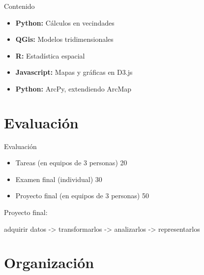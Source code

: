 \documentclass[10pt]{beamer}
\begin{document}
\begin{frame}{Contenido}

  \begin{itemize}
  \item \textbf{Python:} Cálculos en vecindades 
  \item \textbf{QGis:} Modelos tridimensionales
  \item \textbf{R:} Estadística espacial
  \item \textbf{Javascript:} Mapas y gráficas en D3.js
  \item \textbf{Python:} ArcPy, extendiendo ArcMap
  \end{itemize}

\end{frame}


\section{Evaluación}

\begin{frame}{Evaluación}

  \begin{itemize}
  \item Tareas (en equipos de 3 personas) 20%
  \item Examen final (individual) 30%
  \item Proyecto final (en equipos de 3 personas) 50%
  \end{itemize}\pause

  \begin{block}{}
    Proyecto final:

    adquirir datos -> transformarlos -> analizarlos -> representarlos
  \end{block}

\end{frame}


\section{Organización}
\end{document}
